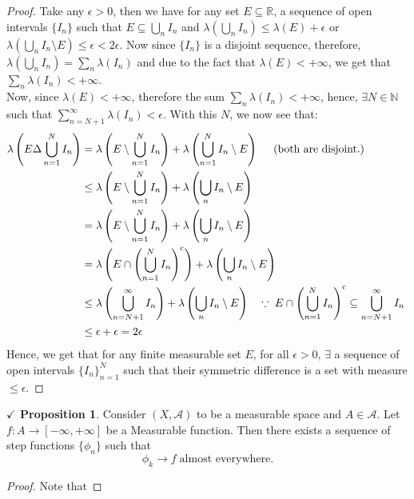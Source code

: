 \documentclass{article}
\theoremstyle{definition}
\theoremstyle{remark}
\theoremstyle{definition}
\theoremstyle{definition}
\newtheorem{proposition}{$\checkmark$ Proposition}
\theoremstyle{definition}
\newcommand{\union}{\cup}
\newcommand{\intrs}{\cap}
\newcommand{\bunion}{\bigcup}
\newcommand{\bintrs}{\bigcap}
\newcommand{\R}{\mathbb{R}}
\newcommand{\N}{\mathbb{N}}
\newcommand{\alg}[1]{\mathscr{#1}}
\newcommand{\comp}[1]{#1^{\text{c}}}
\newcommand{\lm}[1]{\lambda\left (#1\right )}
\begin{document}
\begin{proof}
	Take any $ \epsilon > 0 $, then we have for any set $ E \subseteq\R $, a sequence of open intervals $ \{I_n\} $ such that $ E\subseteq \bunion_n I_n $ and $ \lm{\bunion_n I_n} \le \lm{E} + \epsilon $ or $ \lm{\bunion_n I_n \setminus E} \le \epsilon <2\epsilon$. Now since $ \{I_n\} $ is a disjoint sequence, therefore, $ \lm{\bunion_n I_n} = \sum_n \lm{I_n} $ and due to the fact that $ \lm{E} < + \infty $, we get that $ \sum_n  \lm{I_n} < + \infty$.\\
Now, since $ \lm{E} < + \infty $, therefore the sum $ \sum_{n} \lm{I_n} <+\infty$, hence, $ \exists N \in \N $ such that $ \sum_{n=N+1}^{\infty}\lm{I_n} < \epsilon $. With this $ N $, we now see that:
\begin{equation*}
	\begin{split}
		\lm{E\Delta \bunion_{n=1}^{N} I_n} &= \lm{E\setminus \bunion_{n=1}^{N} I_n} + \lm{\bunion_{n=1}^{N}I_n \setminus E} \;\;\;\;\;\text{(both are disjoint.)}\\
		&\le \lm{E\setminus \bunion_{n=1}^{N} I_n} + \lm{\bunion_{n}I_n \setminus E}\\
		&= \lm{E\setminus \bunion_{n=1}^{N} I_n} + \lm{\bunion_{n}I_n \setminus E}\\
		&= \lm{E\intrs \left (\bunion_{n=1}^{N} I_n\right )^{\text{c}}} +  \lm{\bunion_{n}I_n \setminus E}\\
		&\le \lm{\bunion_{n=N+1}^{\infty} I_n} +\lm{\bunion_{n}I_n \setminus E}\;\;\;\;\text{$ \because \; E\intrs \left (\bunion_{n=1}^{N} I_n\right )^{\text{c}}\subseteq \bunion_{n=N+1}^{\infty} I_n$ }\\
		&\le \epsilon + \epsilon = 2\epsilon
	\end{split}
\end{equation*}
Hence, we get that for any finite measurable set $ E $, for all $ \epsilon > 0 $, $ \exists  $ a sequence of open intervals $ \{I_n\}_{n=1}^{N} $ such that their symmetric difference is a set with measure $ \le \epsilon $.
\end{proof}
\hrulefill
\begin{proposition}
		Consider $ (X,\alg{A}) $ to be a measurable space and $ A\in \alg{A} $. Let $ f : A\to [-\infty,+\infty] $ be a Measurable function. Then there exists a sequence of step functions $ \{\phi_n\} $ such that
		\[\phi_k \longrightarrow f\;\text{almost everywhere.}\]
\end{proposition}
\begin{proof}
	Note that
\end{proof}
\newpage
\end{document}
